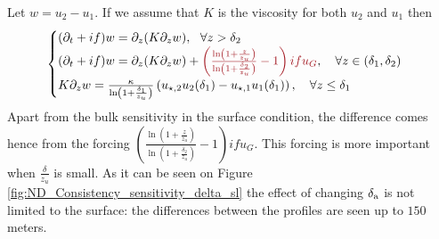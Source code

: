 Let $w=u_2 - u_1$. If we assume that $K$ is the viscosity for both
$u_2$ and $u_1$ then
\begin{equation}
	\begin{cases}
		(\partial_t + if) w = \partial_z (K \partial_z w) ,
		~~ \forall z > \delta_2 \\
(\partial_t + if) w = \partial_z (K \partial_z w)
		+ \emphase{\left(\frac{\ln(1+\frac{z}{z_u})}
		{\ln(1+\frac{\delta_2}{z_u})} - 1\right)i f u_G}
, ~~~\forall z \in (\delta_1, \delta_2) \\
		K \partial_z w = \frac{\kappa}
		{\ln(1+\frac{\delta_1}{z_u})}\left(
		u_{\star, 2} u_2(\delta_1) -
		u_{\star, 1} u_1(\delta_1)\right),
		~~~ \forall z \leq \delta_1
	\end{cases}
\end{equation}
Apart from the bulk sensitivity in the surface condition,
the difference comes hence from the forcing
$\left(\frac{\ln(1+\frac{z}{z_u})}
{\ln(1+\frac{\delta_2}{z_u})} - 1\right)i f u_G$.
This forcing is more important when $\frac{\delta}{z_u}$
is small. As it can be seen on Figure
\ref{fig:ND_Consistency_sensitivity_delta_sl}
the effect of changing $\delta_{\rm a}$ is not limited to the surface:
the differences between the profiles are seen up
to $150$ meters.
